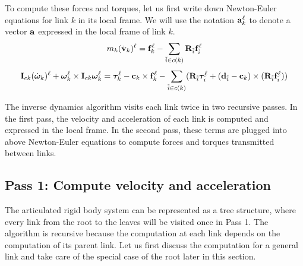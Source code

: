 To compute these forces and torques, let us first write down
Newton-Euler equations for link $k$ in its local frame. We will use
the notation $\mathbf{a}_k^\ell$ to denote a vector $\mathbf{a}$ expressed in
the local frame of link $k$. 
\begin{equation}
\label{eqn:local_newton}
m_k (\dot{\mathbf{v}}_k)^\ell  =  \mathbf{f}_k^\ell - \sum_{\tilde{i} \in
  c(k)} \mathbf{R}_{\tilde{i}}\mathbf{f}_{\tilde{i}}^\ell 
\end{equation}
\begin{equation}
\label{eqn:local_euler}
\mathbf{I}_{ck} (\dot{\bm{\omega}}_k)^\ell + \bm{\omega}_k^\ell \times
\mathbf{I}_{ck} \bm{\omega}_k^\ell =  \bm{\tau}_k^\ell - \mathbf{c}_k \times
\mathbf{f}_k^\ell - \sum_{\tilde{i} \in c(k)} (\mathbf{R}_{\tilde{i}}\bm{\tau}_{\tilde{i}}^\ell +
(\mathbf{d}_{\tilde{i}} - \mathbf{c}_k) \times (\mathbf{R}_{\tilde{i}} \mathbf{f}_{\tilde{i}}^\ell))
\end{equation}

The inverse dynamics algorithm visits each link twice in two recursive
passes. In the first pass, the velocity and acceleration of each link
is computed and expressed in the local frame. In the second pass,
these terms are plugged into above Newton-Euler equations to compute
forces and torques transmitted between links.

\subsection{Pass 1: Compute velocity and acceleration}
The articulated rigid body system can be represented as a tree
structure, where every link from the root to the leaves will be
visited once in Pass 1. The algorithm is recursive because the
computation at each link depends on the computation of its parent
link. Let us first discuss the computation for a general link and take
care of the special case of the root later in this section.

